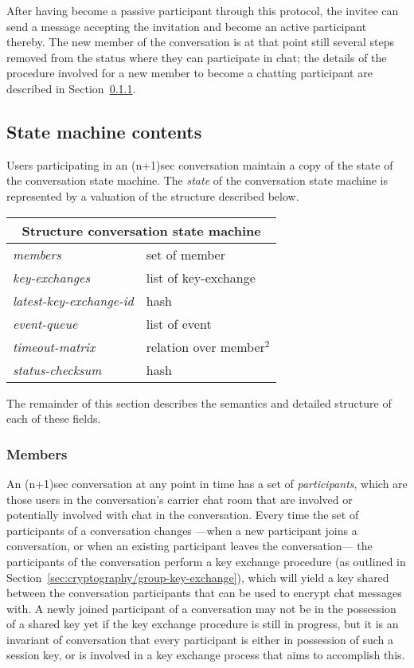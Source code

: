 \documentclass{article}
\def\smfield#1{\textsl{#1}}
\def\type#1{\textsf{#1}}
\newenvironment{struct}[1]{
\newcommand{\structfield}[2]{
\smfield{##1} & \type{##2} \\
\hline
}
\par
\vspace{-\medskipamount}
\hspace{2em minus 2em}\begin{tabular}{|l|l|}
\hline
\multicolumn{2}{|c|}{Structure \type{#1}} \\
\hline
\hline
}{
\end{tabular}
\vspace{-\medskipamount}
\par
}
\begin{document}
After having become a passive participant through this protocol, the invitee can send a message accepting the invitation and become an active participant thereby.
The new member of the conversation is at that point still several steps removed from the status where they can participate in chat; the details of the procedure involved for a new member to become a chatting participant are described in Section~\ref{sec:conversation-state-machine/contents/members}.


\subsection{State machine contents}
\label{sec:conversation-state-machine/contents}

Users participating in an (n+1)sec conversation maintain a copy of the state of the conversation state machine.
The \emph{state} of the conversation state machine is represented by a valuation of the structure described below.

\begin{struct}{conversation state machine}
\structfield{members}{set of member}
\structfield{key-exchanges}{list of key-exchange}
\structfield{latest-key-exchange-id}{hash}
\structfield{event-queue}{list of event}
\structfield{timeout-matrix}{relation over member$^2$}
\structfield{status-checksum}{hash}
\end{struct}

The remainder of this section describes the semantics and detailed structure of each of these fields.


\subsubsection{Members}
\label{sec:conversation-state-machine/contents/members}

An (n+1)sec conversation at any point in time has a set of \emph{participants}, which are those users in the conversation's carrier chat room that are involved or potentially involved with chat in the conversation.
Every time the set of participants of a conversation changes ---when a new participant joins a conversation, or when an existing participant leaves the conversation--- the participants of the conversation perform a key exchange procedure (as outlined in Section~\ref{sec:cryptography/group-key-exchange}), which will yield a key shared between the conversation participants that can be used to encrypt chat messages with.
A newly joined participant of a conversation may not be in the possession of a shared key yet if the key exchange procedure is still in progress, but it is an invariant of conversation that every participant is either in possession of such a session key, or is involved in a key exchange process that aims to accomplish this.
\end{document}
